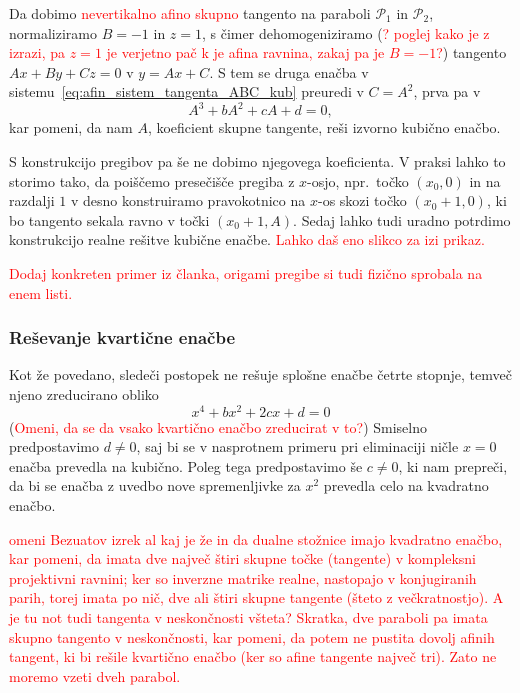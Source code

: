 Da dobimo \textcolor{red}{nevertikalno afino skupno} tangento na paraboli $\mathcal{P}_1$ in $\mathcal{P}_2$, normaliziramo $B = -1$ in $z = 1$, s čimer dehomogeniziramo (\textcolor{red}{? poglej kako je z izrazi, pa $z = 1$ je verjetno pač k je afina ravnina, zakaj pa je $B = -1$?}) tangento $Ax + By + Cz = 0$ v $y = Ax + C$. S tem se druga enačba v sistemu~\ref{eq:afin_sistem_tangenta_ABC_kub} preuredi v $C = A^2$, prva pa v
$$ A^3 + bA^2 + cA + d = 0,$$
kar pomeni, da nam $A$, koeficient skupne tangente, reši izvorno kubično enačbo.
\begin{opomba}
    S konstrukcijo pregibov pa še ne dobimo njegovega koeficienta. V praksi lahko to storimo tako, da poiščemo presečišče pregiba z $x$-osjo, npr.\ točko $(x_0, 0)$ in na razdalji $1$ v desno konstruiramo  pravokotnico na $x$-os skozi točko $(x_0 + 1, 0)$, ki bo tangento sekala ravno v točki $(x_0 + 1, A)$. Sedaj lahko tudi uradno potrdimo konstrukcijo realne rešitve kubične enačbe.
    \textcolor{red}{Lahko daš eno slikco za izi prikaz.} 
\end{opomba}

\textcolor{red}{Dodaj konkreten primer iz članka, origami pregibe si tudi fizično sprobala na enem listi.}

\subsubsection*{Reševanje kvartične enačbe}

Kot že povedano, sledeči postopek ne rešuje splošne enačbe četrte stopnje, temveč njeno zreducirano obliko
\begin{equation}
    \label{eq:reduc_kvart_ev}
    x^4 + bx^2 + 2cx + d = 0
\end{equation}
(\textcolor{red}{Omeni, da se da vsako kvartično enačbo zreducirat v to?})
Smiselno predpostavimo $d \neq 0$, saj bi se v nasprotnem primeru pri eliminaciji ničle $x = 0$ enačba prevedla na kubično. Poleg tega predpostavimo še $c \neq 0$, ki nam prepreči, da bi se enačba z uvedbo nove spremenljivke za $x^2$ prevedla celo na kvadratno enačbo.

\textcolor{red}{omeni Bezuatov izrek al kaj je že in da dualne stožnice imajo kvadratno enačbo, kar pomeni, da imata dve največ štiri skupne točke (tangente) v kompleksni projektivni ravnini; ker so inverzne matrike realne, nastopajo v konjugiranih parih, torej imata po nič, dve ali štiri skupne tangente (šteto z večkratnostjo). A je tu not tudi tangenta v neskončnosti všteta? Skratka, dve paraboli pa imata skupno tangento v neskončnosti, kar pomeni, da potem ne pustita dovolj afinih tangent, ki bi rešile kvartično enačbo (ker so afine tangente največ tri). Zato ne moremo vzeti dveh parabol.}

